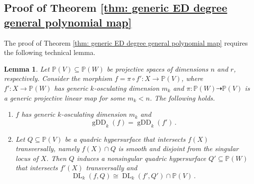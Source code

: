 \documentclass[11pt,reqno]{amsart}
\numberwithin{equation}{section}
\theoremstyle{plain}
\numberwithin{theorem}{section}
\newtheorem{lemma}[theorem]{Lemma}
\theoremstyle{definition}
\renewcommand{\P}{\mathbb{P}}
\newcommand{\DL}{\operatorname{DL}}
\newcommand{\gDD}{\operatorname{gDD}}
\begin{document}
\subsection{Proof of Theorem \ref{thm: generic ED degree general polynomial map}}\label{proof2}

The proof of Theorem \ref{thm: generic ED degree general polynomial map} requires the following technical lemma.

\begin{lemma}\label{lem: technical lemma}
Let $\P(V)\subseteq\P(W)$ be projective spaces of dimensions $n$ and $r$, respectively. Consider the morphism $f=\pi\circ f'\colon X\to\P(V)$, where $f'\colon X\to\P(W)$ has generic $k$-osculating dimension $m_k$ and $\pi \colon \P(W) \dashrightarrow \P(V)$ is a generic projective linear map for some $m_k<n$. The following holds.
\begin{enumerate}
    \item $f$ has generic $k$-osculating dimension $m_k$ and
    \begin{equation}\label{eq: identity gDD f and f'}
    \gDD_k(f) = \gDD_k(f')\,.
    \end{equation}
    \item Let $Q\subseteq\P(V)$ be a quadric hypersurface that intersects $f(X)$ transversally, namely $f(X)\cap Q$ is smooth and disjoint from the singular locus of $X$. Then $Q$ induces a nonsingular quadric hypersurface $Q' \subseteq\P(W)$ that intersects $f'(X)$ transversally and
    \begin{equation}\label{eq: isomorphism between intersection data locus and data locus of projection}
    \DL_k(f, Q) \cong \DL_k(f',Q') \cap \P(V)\,.
    \end{equation}
\end{enumerate}
\end{lemma}
\end{document}
